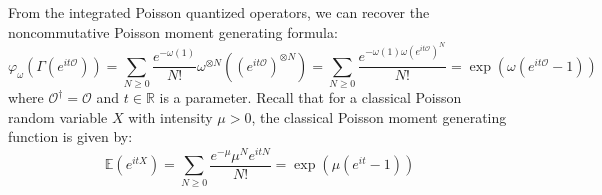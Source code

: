 \documentclass[a4paper,11pt]{article}
\theoremstyle{definition}
\numberwithin{equation}{section}
\begin{document}
From the integrated Poisson quantized operators, we can recover the noncommutative Poisson moment generating formula:
\begin{equation}
    \varphi_\omega(\Gamma(e^{it\mathcal{O}})) = \sum_{N\geq 0 }\frac{e^{-\omega(1)}}{N!}\omega^{\otimes N}((e^{it\mathcal{O}})^{\otimes N}) = \sum_{N\geq 0}\frac{e^{-\omega(1)\omega(e^{it\mathcal{O}})^N}}{N!} = \exp(\omega(e^{it\mathcal{O}} - 1))
\end{equation}
where $\mathcal{O}^\dagger = \mathcal{O}$ and $t \in\mathbb{R}$ is a parameter. Recall that for a classical Poisson random variable $X$ with intensity $\mu > 0$, the classical Poisson moment generating function is given by:
\begin{equation}
    \mathbb{E}(e^{itX}) = \sum_{N\geq 0}\frac{e^{-\mu}\mu^{N}e^{it N}}{N!}=\exp(\mu(e^{it} - 1))
\end{equation}
\end{document}
